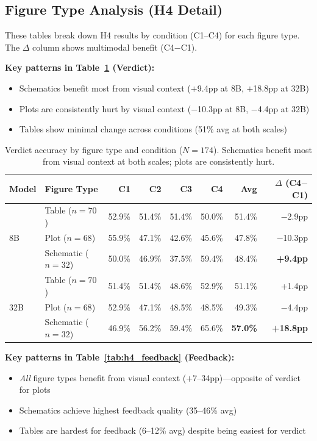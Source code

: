 \documentclass{article} %
\begin{document}
\subsection{Figure Type Analysis (H4 Detail)}

These tables break down H4 results by condition (C1--C4) for each figure type. The $\Delta$ column shows multimodal benefit (C4$-$C1).

\vspace{4pt}
\noindent\textbf{Key patterns in Table~\ref{tab:h4_verdict} (Verdict):}
\begin{itemize}[itemsep=1pt, topsep=2pt, leftmargin=*]
  \item Schematics benefit most from visual context ($+$9.4pp at 8B, $+$18.8pp at 32B)
  \item Plots are consistently hurt by visual context ($-$10.3pp at 8B, $-$4.4pp at 32B)
  \item Tables show minimal change across conditions (51\% avg at both scales)
\end{itemize}

\begin{table}[h]
\centering
\small
\begin{tabular}{@{}llrrrrrr@{}}
\toprule
Model & Figure Type & C1 & C2 & C3 & C4 & Avg & $\Delta$ (C4$-$C1) \\
\midrule
\multirow{3}{*}{8B} & Table ($n{=}70$) & 52.9\% & 51.4\% & 51.4\% & 50.0\% & 51.4\% & $-$2.9pp \\
 & Plot ($n{=}68$) & 55.9\% & 47.1\% & 42.6\% & 45.6\% & 47.8\% & $-$10.3pp \\
 & Schematic ($n{=}32$) & 50.0\% & 46.9\% & 37.5\% & 59.4\% & 48.4\% & \textbf{+9.4pp} \\
\midrule
\multirow{3}{*}{32B} & Table ($n{=}70$) & 51.4\% & 51.4\% & 48.6\% & 52.9\% & 51.1\% & +1.4pp \\
 & Plot ($n{=}68$) & 52.9\% & 47.1\% & 48.5\% & 48.5\% & 49.3\% & $-$4.4pp \\
 & Schematic ($n{=}32$) & 46.9\% & 56.2\% & 59.4\% & 65.6\% & \textbf{57.0\%} & \textbf{+18.8pp} \\
\bottomrule
\end{tabular}
\caption{Verdict accuracy by figure type and condition ($N{=}174$). Schematics benefit most from visual context at both scales; plots are consistently hurt.}
\label{tab:h4_verdict}
\end{table}

\noindent\textbf{Key patterns in Table~\ref{tab:h4_feedback} (Feedback):}
\begin{itemize}[itemsep=1pt, topsep=2pt, leftmargin=*]
  \item \textit{All} figure types benefit from visual context ($+$7--34pp)---opposite of verdict for plots
  \item Schematics achieve highest feedback quality (35--46\% avg)
  \item Tables are hardest for feedback (6--12\% avg) despite being easiest for verdict
\end{itemize}
\end{document}
